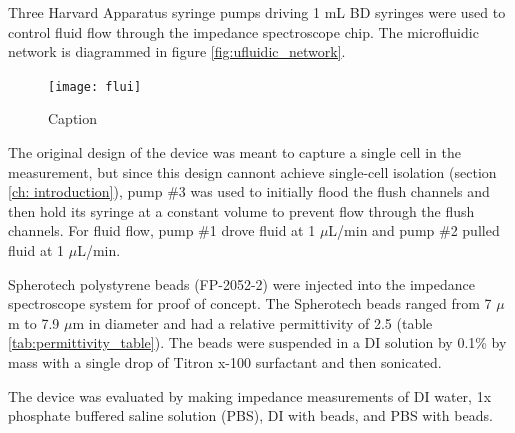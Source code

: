 \par Three Harvard Apparatus syringe pumps driving 1 mL BD syringes were used to control fluid flow through the impedance spectroscope chip. The microfluidic network is diagrammed in figure \ref{fig:ufluidic_network}.

\begin{figure}
    \centering
    \texttt{[image: flui]}
    \caption{Caption}
    \label{fig:my_label}
\end{figure}

\par The original design of the device was meant to capture a single cell in the measurement, but since this design cannont achieve single-cell isolation (section \ref{ch: introduction}), pump \#3 was used to initially flood the flush channels and then hold its syringe at a constant volume to prevent flow through the flush channels. For fluid flow, pump \#1 drove fluid at 1 $\mu$L/min and pump \#2 pulled fluid at 1 $\mu$L/min. 


\par Spherotech polystyrene beads (FP-2052-2) were injected into the impedance spectroscope system for proof of concept. The Spherotech beads ranged from 7 $\mu$m to 7.9 $\mu$m in diameter and had a relative permittivity of 2.5 (table \ref{tab:permittivity_table}). The beads were suspended in a DI solution by 0.1\% by mass with a single drop of Titron x-100 surfactant and then sonicated.

\par The device was evaluated by making impedance measurements of DI water, 1x phosphate buffered saline solution (PBS), DI with beads, and PBS with beads. 

